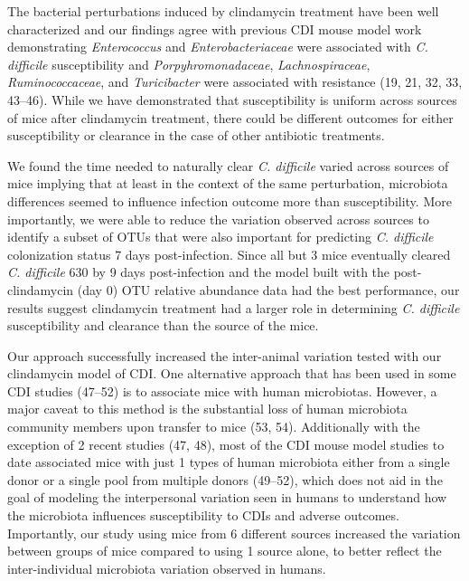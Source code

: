 \documentclass[
  11pt,
]{article}
\begin{document}
The bacterial perturbations induced by clindamycin treatment have been
well characterized and our findings agree with previous CDI mouse model
work demonstrating \emph{Enterococcus} and \emph{Enterobacteriaceae}
were associated with \emph{C. difficile} susceptibility and
\emph{Porpyhromonadaceae}, \emph{Lachnospiraceae},
\emph{Ruminococcaceae}, and \emph{Turicibacter} were associated with
resistance (19, 21, 32, 33, 43--46). While we have demonstrated that
susceptibility is uniform across sources of mice after clindamycin
treatment, there could be different outcomes for either susceptibility
or clearance in the case of other antibiotic treatments.

We found the time needed to naturally clear \emph{C. difficile} varied
across sources of mice implying that at least in the context of the same
perturbation, microbiota differences seemed to influence infection
outcome more than susceptibility. More importantly, we were able to
reduce the variation observed across sources to identify a subset of
OTUs that were also important for predicting \emph{C. difficile}
colonization status 7 days post-infection. Since all but 3 mice
eventually cleared \emph{C. difficile} 630 by 9 days post-infection and
the model built with the post-clindamycin (day 0) OTU relative abundance
data had the best performance, our results suggest clindamycin treatment
had a larger role in determining \emph{C. difficile} susceptibility and
clearance than the source of the mice.

Our approach successfully increased the inter-animal variation tested
with our clindamycin model of CDI. One alternative approach that has
been used in some CDI studies (47--52) is to associate mice with human
microbiotas. However, a major caveat to this method is the substantial
loss of human microbiota community members upon transfer to mice (53,
54). Additionally with the exception of 2 recent studies (47, 48), most
of the CDI mouse model studies to date associated mice with just 1 types
of human microbiota either from a single donor or a single pool from
multiple donors (49--52), which does not aid in the goal of modeling the
interpersonal variation seen in humans to understand how the microbiota
influences susceptibility to CDIs and adverse outcomes. Importantly, our
study using mice from 6 different sources increased the variation
between groups of mice compared to using 1 source alone, to better
reflect the inter-individual microbiota variation observed in humans.
\end{document}
